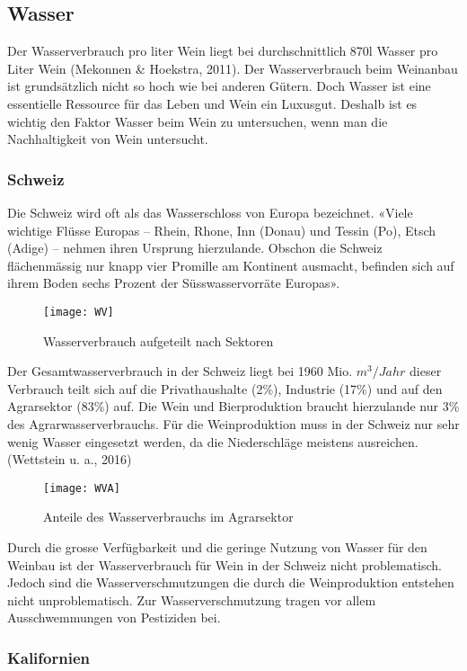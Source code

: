 \subsection{Wasser}
Der Wasserverbrauch pro liter Wein liegt bei durchschnittlich 870l Wasser pro Liter Wein (Mekonnen \& Hoekstra, 2011). Der Wasserverbrauch beim Weinanbau ist grundsätzlich nicht so hoch wie bei anderen Gütern. Doch Wasser ist eine essentielle Ressource für das Leben und Wein ein Luxusgut. Deshalb ist es wichtig den Faktor Wasser beim Wein zu untersuchen, wenn man die Nachhaltigkeit von Wein untersucht.
\subsubsection{Schweiz}
Die Schweiz wird oft als das Wasserschloss von Europa bezeichnet. «Viele wichtige Flüsse Europas – Rhein, Rhone, Inn (Donau) und Tessin (Po), Etsch (Adige) – nehmen ihren Ursprung hierzulande. Obschon die Schweiz flächenmässig nur knapp vier Promille am Kontinent ausmacht, befinden sich auf ihrem Boden sechs Prozent der Süsswasservorräte Europas». \cite{_weil}
\begin{figure}[H]
	\centering
	\texttt{[image: WV]}
	\caption{Wasserverbrauch aufgeteilt nach Sektoren}
\end{figure}
Der Gesamtwasserverbrauch in der Schweiz liegt bei 1960 Mio. $m^3/Jahr$ dieser Verbrauch teilt sich auf die Privathaushalte (2\%), Industrie (17\%) und auf den Agrarsektor (83\%) auf. Die Wein und Bierproduktion braucht hierzulande nur 3\% des Agrarwasserverbrauchs. Für die Weinproduktion muss in der Schweiz nur sehr wenig Wasser eingesetzt werden, da die Niederschläge meistens ausreichen. (Wettstein u. a., 2016)
\begin{figure}[H]
	\centering
	\texttt{[image: WVA]}
	\caption{Anteile des Wasserverbrauchs im       Agrarsektor}
\end{figure}

Durch die grosse Verfügbarkeit und die geringe Nutzung von Wasser für den Weinbau ist der Wasserverbrauch für Wein in der Schweiz nicht problematisch. Jedoch sind die Wasserverschmutzungen die durch die Weinproduktion entstehen nicht unproblematisch. Zur Wasserverschmutzung tragen vor allem Ausschwemmungen von Pestiziden bei.

\subsubsection{Kalifornien}
\label{sub:wasserverbrauch}

